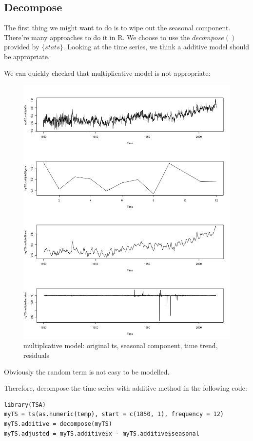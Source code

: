 \documentclass[a4paper, 11pt]{article}
\begin{document}
\subsection{Decompose}
The first thing we might want to do is to wipe out the seasonal component. There're many approaches to do it in R. We choose to use the $decompose()$ provided by $\{stats\}$. Looking at the time series, we think a additive model should be appropriate. \par
We can quickly checked that multiplicative model is not appropriate:
\begin{figure}[H]
\centering
\caption{multiplcative model: original ts, seasonal component, time trend, residuals}
\includegraphics[scale=.40]{component2.png}
\end{figure}
Obviously the random term is not easy to be modelled.\par
Therefore, decompose the time series with additive method in the following code:
\begin{verbatim}
library(TSA)
myTS = ts(as.numeric(temp), start = c(1850, 1), frequency = 12)
myTS.additive = decompose(myTS)
myTS.adjusted = myTS.additive$x - myTS.additive$seasonal
\end{verbatim}
\end{document}
